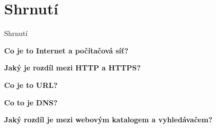 \documentclass[aspectratio=1610]{beamer}
\begin{document}
\section{Shrnutí}
\begin{frame}{Shrnutí}
    \begin{cardTiny}
        \begin{center}
            \textbf{Co je to Internet a počítačová síť?}
        \end{center}
    \end{cardTiny}

    \begin{cardTiny}
        \begin{center}
        \textbf{Jaký je rozdíl mezi HTTP a HTTPS?}
        \end{center}
    \end{cardTiny}

    \begin{cardTiny}
        \begin{center}
        \textbf{Co je to URL?}
        \end{center}
    \end{cardTiny}

    \begin{cardTiny}
        \begin{center}
        \textbf{Co to je DNS?}
        \end{center}
    \end{cardTiny}

    \begin{cardTiny}
        \begin{center}
        \textbf{Jaký rozdíl je mezi webovým katalogem a vyhledávačem?}
        \end{center}
    \end{cardTiny}
\end{frame}
\end{document}
